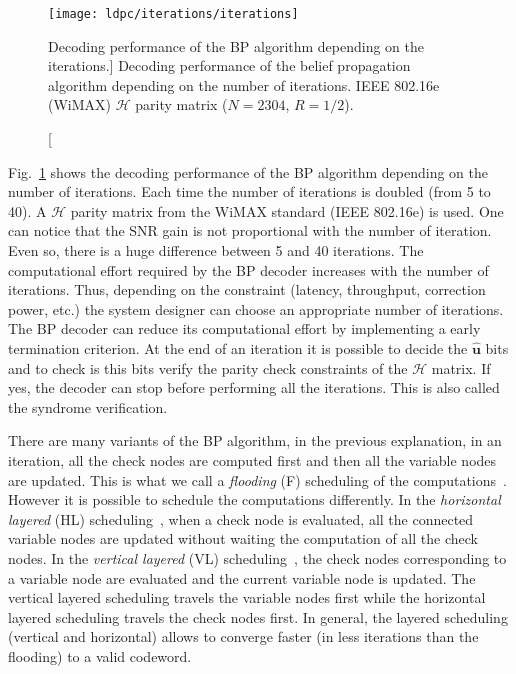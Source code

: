 \begin{figure}[htp]
  \centering
  \texttt{[image: ldpc/iterations/iterations]}
  \caption
    [Decoding performance of the BP algorithm depending on the iterations.]
    {Decoding performance of the belief propagation algorithm depending on the
     number of iterations. IEEE 802.16e (WiMAX) $\mathcal{H}$ parity matrix
     ($N=2304$, $R=1/2$).}
  \label{fig:alg_ldpc_iterations}
\end{figure}

Fig.~\ref{fig:alg_ldpc_iterations} shows the decoding performance of the BP
algorithm depending on the number of iterations. Each time the number of
iterations is doubled (from 5 to 40). A $\mathcal{H}$ parity matrix from the
WiMAX standard (IEEE 802.16e) is used. One can notice that the SNR gain is not
proportional with the number of iteration. Even so, there is a huge difference
between 5 and 40 iterations. The computational effort required by the BP decoder
increases with the number of iterations. Thus, depending on the constraint
(latency, throughput, correction power, etc.) the system designer can choose an
appropriate number of iterations. The BP decoder can reduce its computational
effort by implementing a early termination criterion. At the end of an iteration
it is possible to decide the $\bm{\hat{u}}$ bits and to check is this bits
verify the parity check constraints of the $\bm{\mathcal{H}}$ matrix. If yes,
the decoder can stop before performing all the iterations. This is also called
the syndrome verification.

There are many variants of the BP algorithm, in the previous explanation, in an
iteration, all the check nodes are computed first and then all the variable
nodes are updated. This is what we call a \emph{flooding} (F) scheduling of the
computations~\cite{MacKay1995}. However it is possible to schedule the
computations differently. In the \emph{horizontal layered} (HL)
scheduling~\cite{Yeo2001}, when a check node is evaluated, all the connected
variable nodes are updated without waiting the computation of all the check
nodes. In the \emph{vertical layered} (VL) scheduling~\cite{Zhang2002}, the
check nodes corresponding to a variable node are evaluated and the current
variable node is updated. The vertical layered scheduling travels the variable
nodes first while the horizontal layered scheduling travels the check nodes
first. In general, the layered scheduling (vertical and horizontal) allows to
converge faster (in less iterations than the flooding) to a valid codeword.

